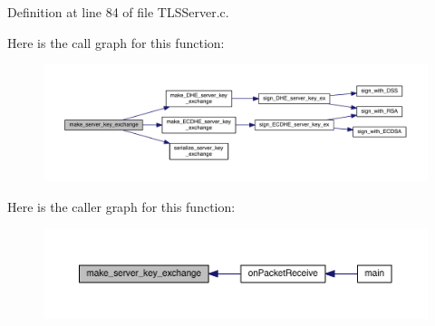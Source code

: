 Definition at line 84 of file T\+L\+S\+Server.\+c.



Here is the call graph for this function\+:\nopagebreak
\begin{figure}[H]
\begin{center}
\leavevmode
\includegraphics[width=350pt]{_t_l_s_server_8c_a78c8cac95d3068e576edf0a0713b03ab_cgraph}
\end{center}
\end{figure}




Here is the caller graph for this function\+:\nopagebreak
\begin{figure}[H]
\begin{center}
\leavevmode
\includegraphics[width=350pt]{_t_l_s_server_8c_a78c8cac95d3068e576edf0a0713b03ab_icgraph}
\end{center}
\end{figure}


